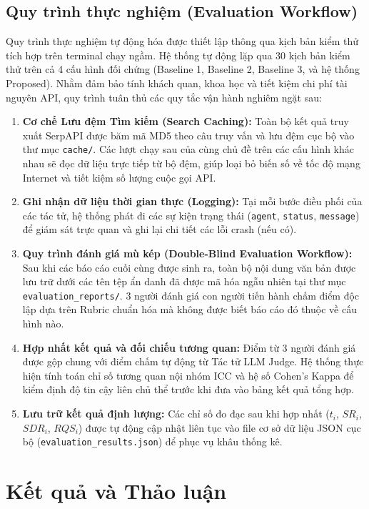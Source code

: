\documentclass[11pt,a4paper]{article}
\begin{document}
\begin{itemize}
\subsection{Quy trình thực nghiệm (Evaluation Workflow)}
Quy trình thực nghiệm tự động hóa được thiết lập thông qua kịch bản kiểm thử tích hợp trên terminal chạy ngầm. Hệ thống tự động lặp qua 30 kịch bản kiểm thử trên cả 4 cấu hình đối chứng (Baseline 1, Baseline 2, Baseline 3, và hệ thống Proposed). Nhằm đảm bảo tính khách quan, khoa học và tiết kiệm chi phí tài nguyên API, quy trình tuân thủ các quy tắc vận hành nghiêm ngặt sau:
\begin{enumerate}
    \item \textbf{Cơ chế Lưu đệm Tìm kiếm (Search Caching):} Toàn bộ kết quả truy xuất SerpAPI được băm mã MD5 theo câu truy vấn và lưu đệm cục bộ vào thư mục \texttt{cache/}. Các lượt chạy sau của cùng chủ đề trên các cấu hình khác nhau sẽ đọc dữ liệu trực tiếp từ bộ đệm, giúp loại bỏ biến số về tốc độ mạng Internet và tiết kiệm số lượng cuộc gọi API.
    \item \textbf{Ghi nhận dữ liệu thời gian thực (Logging):} Tại mỗi bước điều phối của các tác tử, hệ thống phát đi các sự kiện trạng thái (\texttt{agent}, \texttt{status}, \texttt{message}) để giám sát trực quan và ghi lại chi tiết các lỗi crash (nếu có).
    \item \textbf{Quy trình đánh giá mù kép (Double-Blind Evaluation Workflow):} Sau khi các báo cáo cuối cùng được sinh ra, toàn bộ nội dung văn bản được lưu trữ dưới các tên tệp ẩn danh đã được mã hóa ngẫu nhiên tại thư mục \texttt{evaluation\_reports/}. 3 người đánh giá con người tiến hành chấm điểm độc lập dựa trên Rubric chuẩn hóa mà không được biết báo cáo đó thuộc về cấu hình nào.
    \item \textbf{Hợp nhất kết quả và đối chiếu tương quan:} Điểm từ 3 người đánh giá được gộp chung với điểm chấm tự động từ Tác tử LLM Judge. Hệ thống thực hiện tính toán chỉ số tương quan nội nhóm ICC và hệ số Cohen's Kappa để kiểm định độ tin cậy liên chủ thể trước khi đưa vào bảng kết quả tổng hợp.
    \item \textbf{Lưu trữ kết quả định lượng:} Các chỉ số đo đạc sau khi hợp nhất ($t_i$, $SR_i$, $SDR_i$, $RQS_i$) được tự động cập nhật liên tục vào file cơ sở dữ liệu JSON cục bộ (\texttt{evaluation\_results.json}) để phục vụ khâu thống kê.
\end{enumerate}



\section{Kết quả và Thảo luận}


\end{itemize}
\end{document}
